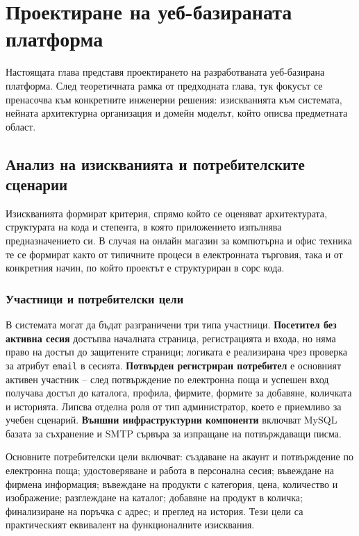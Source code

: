 \section{Проектиране на уеб-базираната платформа}

Настоящата глава представя проектирането на разработваната уеб-базирана платформа. След теоретичната рамка от предходната глава, тук фокусът се пренасочва към конкретните инженерни решения: изискванията към системата, нейната архитектурна организация и домейн моделът, който описва предметната област.

\subsection{Анализ на изискванията и потребителските сценарии}

Изискванията формират критерия, спрямо който се оценяват архитектурата, структурата на кода и степента, в която приложението изпълнява предназначението си. В случая на онлайн магазин за компютърна и офис техника те се формират както от типичните процеси в електронната търговия, така и от конкретния начин, по който проектът е структуриран в сорс кода.

\subsubsection{Участници и потребителски цели}

В системата могат да бъдат разграничени три типа участници. \textbf{Посетител без активна сесия} достъпва началната страница, регистрацията и входа, но няма право на достъп до защитените страници; логиката е реализирана чрез проверка за атрибут \texttt{email} в сесията. \textbf{Потвърден регистриран потребител} е основният активен участник -- след потвърждение по електронна поща и успешен вход получава достъп до каталога, профила, фирмите, формите за добавяне, количката и историята. Липсва отделна роля от тип администратор, което е приемливо за учебен сценарий. \textbf{Външни инфраструктурни компоненти} включват MySQL базата за съхранение и SMTP сървъра за изпращане на потвърждаващи писма.

Основните потребителски цели включват: създаване на акаунт и потвърждение по електронна поща; удостоверяване и работа в персонална сесия; въвеждане на фирмена информация; въвеждане на продукти с категория, цена, количество и изображение; разглеждане на каталог; добавяне на продукт в количка; финализиране на поръчка с адрес; и преглед на история. Тези цели са практическият еквивалент на функционалните изисквания.


